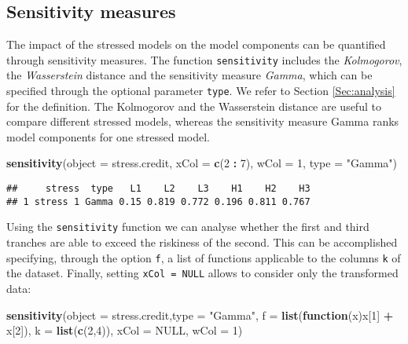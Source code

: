 \documentclass[]{article}
\newenvironment{Shaded}{\begin{snugshade}}{\end{snugshade}}
\newcommand{\ControlFlowTok}[1]{\textcolor[rgb]{0.13,0.29,0.53}{\textbf{#1}}}
\newcommand{\DataTypeTok}[1]{\textcolor[rgb]{0.13,0.29,0.53}{#1}}
\newcommand{\DecValTok}[1]{\textcolor[rgb]{0.00,0.00,0.81}{#1}}
\newcommand{\KeywordTok}[1]{\textcolor[rgb]{0.13,0.29,0.53}{\textbf{#1}}}
\newcommand{\NormalTok}[1]{#1}
\newcommand{\OperatorTok}[1]{\textcolor[rgb]{0.81,0.36,0.00}{\textbf{#1}}}
\newcommand{\OtherTok}[1]{\textcolor[rgb]{0.56,0.35,0.01}{#1}}
\newcommand{\StringTok}[1]{\textcolor[rgb]{0.31,0.60,0.02}{#1}}
\begin{document}
\hypertarget{sensitivity-measures}{%
\subsection{Sensitivity measures}\label{sensitivity-measures}}

The impact of the stressed models on the model components can be quantified through sensitivity measures. The function \texttt{sensitivity} includes the \emph{Kolmogorov}, the \emph{Wasserstein} distance and the sensitivity measure \emph{Gamma}, which can be specified through the optional parameter \texttt{type}. We refer to Section \ref{Sec:analysis} for the definition. The Kolmogorov and the Wasserstein distance are useful to compare different stressed models, whereas the sensitivity measure Gamma ranks model components for one stressed model.

\begin{Shaded}
\begin{Highlighting}[]
\KeywordTok{sensitivity}\NormalTok{(}\DataTypeTok{object =}\NormalTok{ stress.credit, }\DataTypeTok{xCol =} \KeywordTok{c}\NormalTok{(}\DecValTok{2} \OperatorTok{:}\StringTok{ }\DecValTok{7}\NormalTok{), }\DataTypeTok{wCol =} \DecValTok{1}\NormalTok{, }\DataTypeTok{type =} \StringTok{"Gamma"}\NormalTok{)}
\end{Highlighting}
\end{Shaded}

\begin{verbatim}
##     stress  type   L1    L2    L3    H1    H2    H3
## 1 stress 1 Gamma 0.15 0.819 0.772 0.196 0.811 0.767
\end{verbatim}

Using the \texttt{sensitivity} function we can analyse whether the first and third tranches are able to exceed the riskiness of the second. This can be accomplished specifying, through the option \texttt{f}, a list of functions applicable to the columns \texttt{k} of the dataset. Finally, setting \texttt{xCol\ =\ NULL} allows to consider only the transformed data:

\begin{Shaded}
\begin{Highlighting}[]
\KeywordTok{sensitivity}\NormalTok{(}\DataTypeTok{object =}\NormalTok{ stress.credit,}\DataTypeTok{type =} \StringTok{"Gamma"}\NormalTok{, }\DataTypeTok{f =} \KeywordTok{list}\NormalTok{(}\ControlFlowTok{function}\NormalTok{(x)x[}\DecValTok{1}\NormalTok{] }\OperatorTok{+}\StringTok{ }\NormalTok{x[}\DecValTok{2}\NormalTok{]), }
            \DataTypeTok{k =} \KeywordTok{list}\NormalTok{(}\KeywordTok{c}\NormalTok{(}\DecValTok{2}\NormalTok{,}\DecValTok{4}\NormalTok{)), }\DataTypeTok{xCol =} \OtherTok{NULL}\NormalTok{, }\DataTypeTok{wCol =} \DecValTok{1}\NormalTok{)}
\end{Highlighting}
\end{Shaded}
\end{document}
